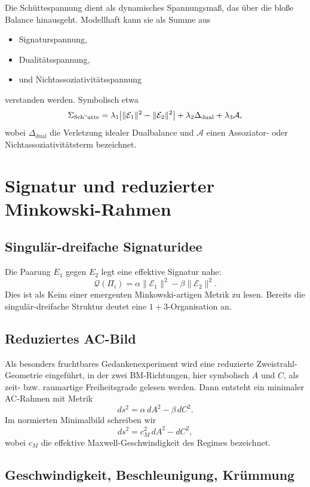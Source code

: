 \documentclass[11pt,a4paper]{article}
\theoremstyle{definition}
\theoremstyle{plain}
\begin{document}
	Die Schüttespannung dient als dynamisches Spannungsmaß, das über die bloße Balance hinausgeht. Modellhaft kann sie als Summe aus
	\begin{itemize}[leftmargin=2em]
		\item Signaturspannung,
		\item Dualitätsspannung,
		\item und Nichtassoziativitätsspannung
	\end{itemize}
	verstanden werden. Symbolisch etwa
	\[
	\Sigma_{\mathrm{Sch"utte}}
	=
	\lambda_1\bigl|\|\mathcal E_1\|^2-\|\mathcal E_2\|^2\bigr|
	+\lambda_2\Delta_{\mathrm{dual}}
	+\lambda_3\mathcal A,
	\]
	wobei $\Delta_{\mathrm{dual}}$ die Verletzung idealer Dualbalance und $\mathcal A$ einen Assoziator- oder Nichtassoziativitätsterm bezeichnet.
	
	\section{Signatur und reduzierter Minkowski-Rahmen}
	
	\subsection{Singulär-dreifache Signaturidee}
	
	Die Paarung $E_1$ gegen $E_2$ legt eine effektive Signatur nahe:
	\[
	\mathcal Q(\Pi_i)=\alpha\|\mathcal E_1\|^2-\beta\|\mathcal E_2\|^2.
	\]
	Dies ist als Keim einer emergenten Minkowski-artigen Metrik zu lesen. Bereits die singulär-dreifache Struktur deutet eine $1+3$-Organisation an.
	
	\subsection{Reduziertes AC-Bild}
	
	Als besonders fruchtbares Gedankenexperiment wird eine reduzierte Zweistrahl-Geometrie eingeführt, in der zwei BM-Richtungen, hier symbolisch $A$ und $C$, als zeit- bzw. raumartige Freiheitsgrade gelesen werden. Dann entsteht ein minimaler AC-Rahmen mit Metrik
	\[
	ds^2 = \alpha\, dA^2 - \beta\, dC^2.
	\]
	Im normierten Minimalbild schreiben wir
	\[
	ds^2 = c_M^2\, dA^2 - dC^2,
	\]
	wobei $c_M$ die effektive Maxwell-Geschwindigkeit des Regimes bezeichnet.
	
	\subsection{Geschwindigkeit, Beschleunigung, Krümmung}
	
\end{document}
